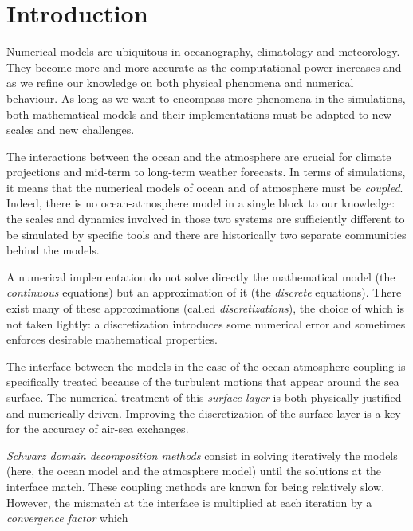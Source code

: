 
\chapter*{Introduction}
\label{ch:introduction}
Numerical models are ubiquitous in oceanography, climatology and
meteorology. They become more and more accurate as the
computational power increases and as we refine our knowledge on
both physical phenomena and numerical behaviour.
As long as we want to encompass more phenomena in the simulations,
both mathematical models and their implementations must be
adapted to new scales and new challenges.
\par %
The interactions between the ocean and the atmosphere are crucial
for climate projections and mid-term to long-term weather forecasts.
In terms of simulations, it means that the numerical models of
ocean and of atmosphere must be \textit{coupled}.
Indeed, there is no ocean-atmosphere model in a single
block to our knowledge:
the scales and dynamics involved in those two systems are
sufficiently different to be simulated by specific tools
and there are historically two separate communities behind the
models.
\par %
A numerical implementation do not solve directly the mathematical
model (the \textit{continuous} equations) but an approximation of it
(the \textit{discrete} equations). There exist many of these
approximations (called \textit{discretizations}), the choice of which
is not taken lightly: a discretization introduces some
numerical error and sometimes enforces desirable mathematical
properties.
\par %
The interface between the models in the case of
the ocean-atmosphere coupling is specifically treated because
of the turbulent motions that appear around the sea surface.
The numerical treatment of this \textit{surface layer}
is both physically justified and numerically driven.
Improving the discretization of the surface
layer is a key for the accuracy of air-sea exchanges.
\par %
\textit{Schwarz domain decomposition methods} consist in solving
iteratively the models (here, the ocean model and the
atmosphere model) until the solutions at the interface match.
These coupling methods are known for being relatively slow.
However, the mismatch at the interface is multiplied
at each iteration by a \textit{convergence factor} which
